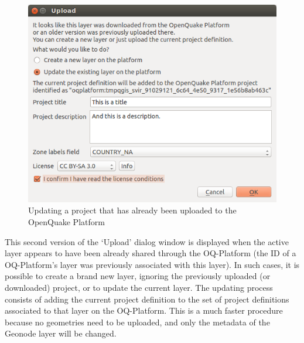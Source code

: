 \begin{figure}
    \centering
    \includegraphics[width=\textwidth]{../images/image21}
    \caption{Updating a project that has already been uploaded to the OpenQuake Platform}
    \label{fig:update_dialog}
\end{figure}

This second version of the `Upload' dialog window is displayed when the active
layer appears to have been already shared through the OQ-Platform (the ID of a
OQ-Platform's layer was previously associated with this layer). In such cases,
it is possible to create a brand new layer, ignoring the previously uploaded
(or downloaded) project, or to update the current layer. The updating process
consists of adding the current project definition to the set of project
definitions associated to that layer on the OQ-Platform. This is a much faster
procedure because no geometries need to be uploaded, and only the metadata of
the Geonode layer will be changed.
